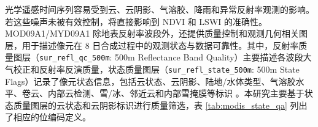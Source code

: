 光学遥感时间序列容易受到云、云阴影、气溶胶、降雨和异常反射率观测的影响。若这些噪声未被有效控制，将直接影响到 NDVI 和 LSWI 的准确性。MOD09A1/MYD09A1 除地表反射率波段外，还提供质量控制和观测几何相关图层，用于描述像元在 8 日合成过程中的观测状态与数据可靠性。其中，反射率质量图层（\texttt{sur\_refl\_qc\_500m}: 500m Reflectance Band Quality）主要描述各波段大气校正和反射率反演质量，状态质量图层（\texttt{sur\_refl\_state\_500m}: 500m State Flags）记录了像元状态信息，包括云状态、云阴影、陆地/水体类型、气溶胶水平、卷云、内部云检测、雪/冰、邻近云和内部雪掩膜等标识 \cite{Vermote2015MOD09UserGuide}。本研究主要基于状态质量图层的云状态和云阴影标识进行质量筛选，表 \ref{tab:modis_state_qa} 列出了相应的位编码定义。

